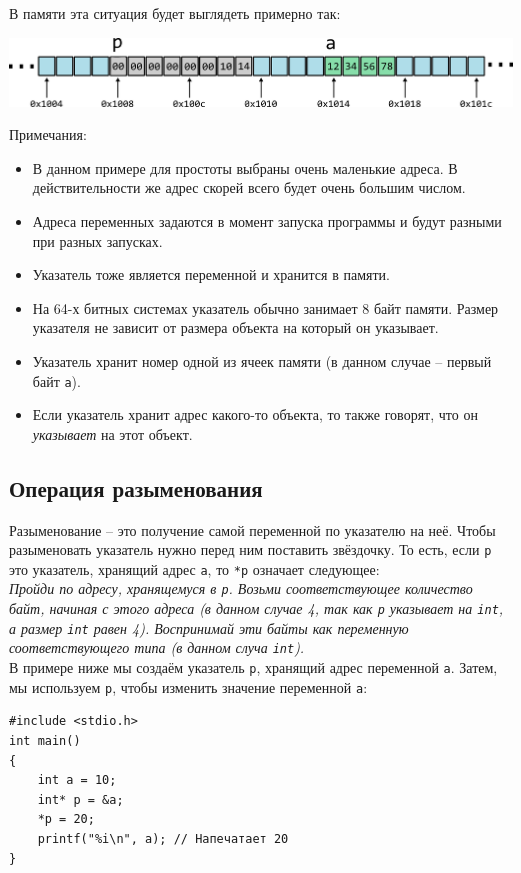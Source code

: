 \documentclass[10pt]{article}
\begin{document}
В памяти эта ситуация будет выглядеть примерно так:

\begin{center}
\includegraphics[scale=1]{../images/memory_3_pointer_to_int_b.png}
\end{center}
Примечания:
\begin{itemize}
\item В данном примере для простоты выбраны очень маленькие адреса. В действительности же адрес скорей всего будет очень большим числом.
\item Адреса переменных задаются в момент запуска программы и будут разными при разных запусках.
\item Указатель тоже является переменной и хранится в памяти.
\item На 64-х битных системах указатель обычно занимает 8 байт памяти.
Размер указателя не зависит от размера объекта на который он указывает.
\item Указатель хранит номер одной из ячеек памяти (в данном случае -- первый байт \texttt{a}).
\item Если указатель хранит адрес какого-то объекта, то также говорят, что он \textit{указывает} на этот объект.
\end{itemize}

\subsection*{Операция разыменования}
Разыменование -- это получение самой переменной по указателю на неё. Чтобы разыменовать указатель нужно перед ним поставить звёздочку. То есть, если \texttt{p} это указатель, хранящий адрес \texttt{a}, то \texttt{*p} означает следующее:\\

\textit{Пройди по адресу, хранящемуся в \texttt{p}. Возьми соответствующее количество байт, начиная с этого адреса (в данном случае 4, так как \texttt{p} указывает на \texttt{int}, а размер \texttt{int} равен 4). Воспринимай эти байты как переменную соответствующего типа (в данном случа \texttt{int}).}\\

В примере ниже мы создаём указатель \texttt{p}, хранящий адрес переменной \texttt{a}. Затем, мы используем \texttt{p}, чтобы изменить значение переменной \texttt{a}:
\begin{lstlisting}
#include <stdio.h>
int main() 
{
    int a = 10;
    int* p = &a;
    *p = 20;
    printf("%i\n", a); // Напечатает 20
}
\end{lstlisting}
\end{document}
